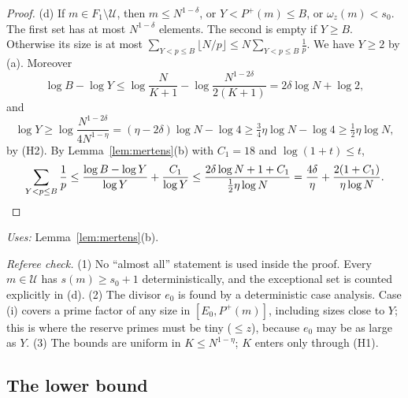 \documentclass[11pt]{amsart}
\theoremstyle{definition}
\newcommand{\cU}{\mathcal{U}}
\newcommand{\Pp}{P^{+}}
\newcommand{\uses}[1]{\par\smallskip\noindent\textit{Uses:} #1\par\smallskip}
\begin{document}
\begin{proof}
(d) If $m\in F_1\setminus\cU$, then $m\le N^{1-\delta}$, or $Y<\Pp(m)\le B$, or $\omega_z(m)<s_0$. The first set has at most $N^{1-\delta}$ elements. The second is empty if $Y\ge B$. Otherwise its size is at most $\sum_{Y<p\le B}\lfloor N/p\rfloor\le N\sum_{Y<p\le B}\frac1p$. We have $Y\ge2$ by (a). Moreover
\[
\log B-\log Y\le\log\frac{N}{K+1}-\log\frac{N^{1-2\delta}}{2(K+1)}=2\delta\log N+\log2,
\]
and
\[
\log Y\ge\log\frac{N^{1-2\delta}}{4N^{1-\eta}}=(\eta-2\delta)\log N-\log4\ge\tfrac34\eta\log N-\log 4\ge\tfrac12\eta\log N,
\]
by (H2). By Lemma~\ref{lem:mertens}(b) with $C_1=18$ and $\log(1+t)\le t$,
\[
\sum_{Y<p\le B}\frac1p\le\frac{\log B-\log Y}{\log Y}+\frac{C_1}{\log Y}\le\frac{2\delta\log N+1+C_1}{\frac12\eta\log N}=\frac{4\delta}{\eta}+\frac{2(1+C_1)}{\eta\log N}.\qedhere
\]
\end{proof}
\uses{Lemma~\ref{lem:mertens}(b).}

\noindent\emph{Referee check.} (1) No ``almost all'' statement is used inside the proof. Every $m\in\cU$ has $s(m)\ge s_0+1$ deterministically, and the exceptional set is counted explicitly in (d). (2) The divisor $e_0$ is found by a deterministic case analysis. Case (i) covers a prime factor of any size in $[E_0,\Pp(m)]$, including sizes close to $Y$; this is where the reserve primes must be tiny ($\le z$), because $e_0$ may be as large as $Y$. (3) The bounds are uniform in $K\le N^{1-\eta}$; $K$ enters only through (H1).

\subsection{The lower bound}
\end{document}
